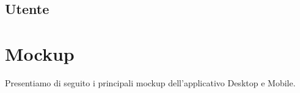 \subsection{Utente}







\pagebreak
\section{Mockup}
Presentiamo di seguito i principali mockup dell'applicativo Desktop e Mobile.




